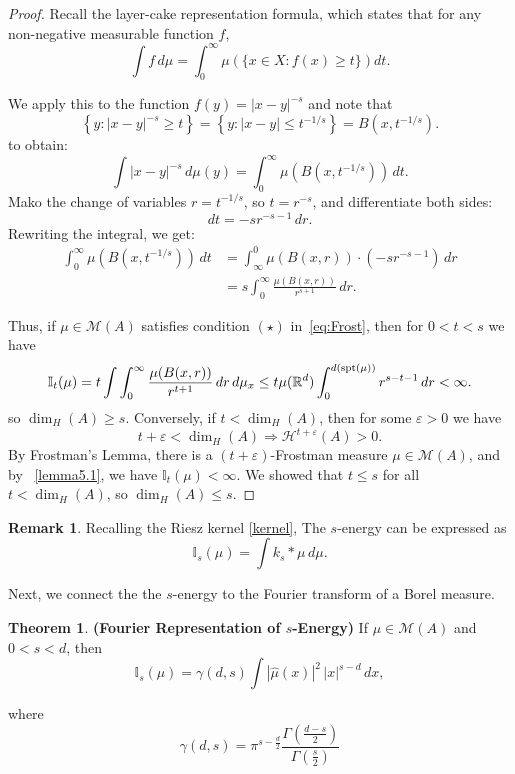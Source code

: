 \documentclass[12pt,a4paper]{report}
\theoremstyle{definition}
\newtheorem{theorem}{Theorem}
\newtheorem{remark}{Remark}
\begin{document}
\begin{proof}
Recall the layer-cake representation formula, which states that for any non-negative measurable function \( f \),
\begin{equation}
\int f \, d\mu = \int_0^\infty \mu\left( \{ x \in X : f(x) \geq t \} \right) dt.
\label{cake}
\end{equation}

We apply this to the function \( f(y) = |x - y|^{-s} \) and note that
\[
\left\{ y : |x - y|^{-s} \geq t \right\} = \left\{ y : |x - y| \leq t^{-1/s} \right\} = B(x, t^{-1/s}).
\]
to obtain:
\[
\int |x - y|^{-s} \, d\mu(y) = \int_0^\infty \mu(B(x, t^{-1/s})) \, dt.
\]
Mako the change of variables \( r = t^{-1/s} \), so \( t = r^{-s} \), and differentiate both sides:
\[
dt = -s r^{-s-1} \, dr.
\]
Rewriting the integral, we get:
\begin{align*}
\int_0^\infty \mu(B(x, t^{-1/s})) \, dt
&= \int_\infty^0 \mu(B(x, r)) \cdot (-s r^{-s-1}) \, dr \\
&= s \int_0^\infty \frac{\mu(B(x, r))}{r^{s+1}} \, dr.
\end{align*}

Thus, if \( \mu \in \mathcal{M}(A) \) satisfies condition $(\star)$ in~\ref{eq:Frost}, then for \( 0 < t < s \) we have
\begin{equation}
\mathbb{I}_t(\mu) = t \int \int_0^\infty \frac{\mu(B(x, r))}{r^{t+1}} \, dr \, d\mu_x
\leq t \mu(\mathbb{R}^d) \int_0^{d(\mathrm{spt}(\mu))} r^{s - t - 1} \, dr < \infty.
\notag
\end{equation}
so \( \dim_H(A) \geq s \).
Conversely, if \( t < \dim_H(A) \), then for some \( \varepsilon > 0 \) we have
\[
t + \varepsilon < \dim_H(A) \Rightarrow \mathcal{H}^{t + \varepsilon}(A) > 0.
\]
By Frostman's Lemma, there is a \( (t + \varepsilon) \)-Frostman measure \( \mu \in \mathcal{M}(A) \), and by ~\ref{lemma5.1}, we have \( \mathbb{I}_t(\mu) < \infty \). We showed that \( t \leq s \) for all \( t < \dim_H(A) \), so \( \dim_H(A) \leq s \).
\end{proof}

\begin{remark}
Recalling the Riesz kernel \ref{kernel}, The $s$-energy can be expressed as
\[
\mathbb{I}_s(\mu) = \int k_s * \mu \, d\mu.
\]
\end{remark}

Next, we connect the the $s$-energy to the Fourier transform of a Borel measure.

\begin{theorem}{\textbf{(Fourier Representation of \( s \)-Energy)}} \label{eq:FourierRep_Energy}
If \( \mu \in \mathcal{M}(A) \) and \( 0 < s < d \), then
\[
\mathbb{I}_s(\mu) = \gamma(d, s) \int |\widehat{\mu}(x)|^2 \, |x|^{s - d} \, dx,
\]

where
$$\gamma(d, s) = \pi^{s-\frac{d}{2}} \frac{\Gamma(\frac{d-s}{2})}{\Gamma(\frac{s}{2})}$$
\end{theorem}
\end{document}
